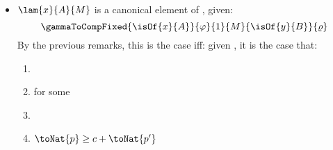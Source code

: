 \begin{itemize}
    \item $\lam{x}{A}{M}$ is a canonical element of , given:
\[
    \gammaToCompFixed{\isOf{x}{A}}{\varphi}{1}{M}{\isOf{y}{B}}{\varrho}
    \]
By the previous remarks, this is the case iff:
given , it is the case that:
\begin{enumerate}
    \item {}
    \item {} for some 
    \item {}
    \item $\toNat{p} \ge c + \toNat{p'}$
\end{enumerate}

\end{itemize}


